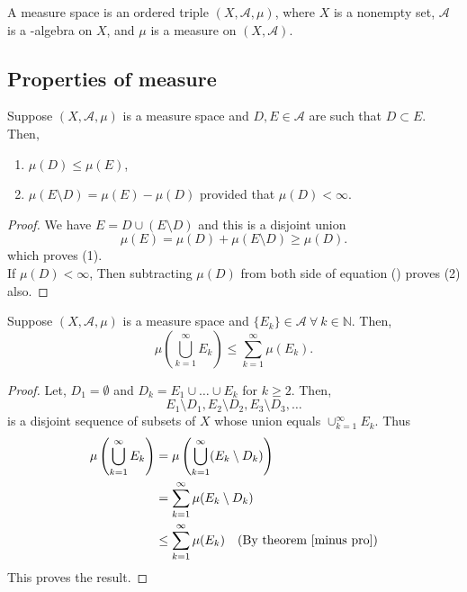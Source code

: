 \begin{definition}
    A measure space is an ordered triple $(X,\mathcal{A},\mu)$, where $X$ is a nonempty set,  $\mathcal{A}$ is a \sig-algebra on $X$, and  $\mu$ is a measure on  $(X,\mathcal{A})$.
\end{definition}

\subsection*{Properties of measure}

\begin{theorem}
    \label{minus pro}
    Suppose $(X,\mathcal{A},\mu)$ is a measure space and $D,E\in\mathcal{A}$ are such that $D\subset E$. Then,
    \begin{enumerate}
        \item $\mu(D)\le \mu(E)$,
        \item $\mu(E\setminus D)=\mu(E)-\mu(D)$ provided that $\mu(D)<\infty$.
    \end{enumerate}
\end{theorem}
\begin{proof}
    We have $E=D\cup(E\setminus D)$ and this is a disjoint union
    \begin{equation}
        \label{muE}
        \mu(E) = \mu(D) + \mu(E\setminus D) \ge \mu(D).
    \end{equation}
    which proves (1).\\
    If $\mu(D)<\infty$, Then subtracting $\mu(D)$ from both side of equation () proves (2) also.
\end{proof}

\begin{theorem}[]
    Suppose $(X,\mathcal{A},\mu)$ is a measure space and $\{E_k\}\in\mathcal{A}\ \forall\ k\in \mathds{N}$. Then,
    \[
        \mu \left( \bigcup_{k=1}^{\infty}E_k \right)\le \sum_{k=1}^{\infty}\mu(E_k). 
    \]
\end{theorem}
\begin{proof}
    Let, $D_1=\emptyset$ and $D_k=E_1\cup \ldots\cup E_k$ for $k\ge 2$. Then,
    \[
        E_1\setminus D_1,E_2\setminus D_2,E_3\setminus D_3,\ldots
    \]
    is a disjoint sequence of subsets of $X$ whose union equals  $\cup_{k=1}^{\infty}E_k$. Thus
    \begin{align*}
        \mu\left( \bigcup_{k=1}^{\infty}E_k \right) &= \mu\left( \bigcup_{k=1}^{\infty}(E_k\setminus D_k) \right)\\
                                                    &= \sum_{k=1}^{\infty} \mu(E_k\setminus D_k)\\
                                                    &\le \sum_{k=1}^{\infty}\mu(E_k) \ \ \text{ (By theorem \refeq{minus pro})}
    \end{align*}
    This proves the result.
\end{proof}

